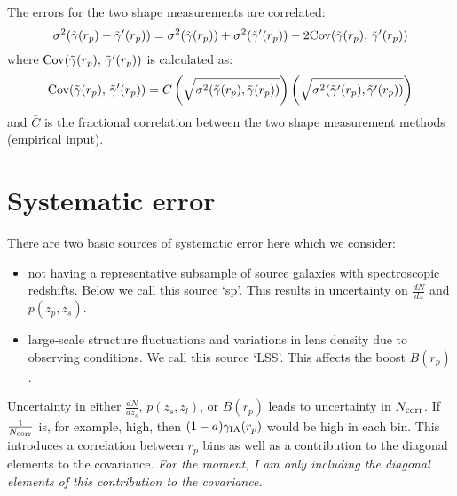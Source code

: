 \documentclass[onecolumn,amsmath,aps,fleqn, superscriptaddress]{revtex4}
\begin{document}
The errors for the two shape measurements are correlated:
\begin{equation}
\sigma^2(\tilde{\gamma}(r_p) - \tilde{\gamma}^\prime(r_p)) = \sigma^2(\tilde{\gamma}(r_p)) + \sigma^2(\tilde{\gamma}^\prime(r_p)) - 2 {\rm Cov}( \tilde{\gamma}(r_p), \, \tilde{\gamma}^\prime(r_p))
\label{comb_gammat}
\end{equation}
where ${\rm Cov}( \tilde{\gamma}(r_p), \, \tilde{\gamma}^\prime(r_p))$ is calculated as:
\begin{equation}
{\rm Cov}( \tilde{\gamma}(r_p), \, \tilde{\gamma}^\prime(r_p)) = \bar{C} \left(\sqrt{\sigma^2(\tilde{\gamma}(r_p), \tilde{\gamma}(r_p))}\right)\left(\sqrt{\sigma^2(\tilde{\gamma}^\prime(r_p), \tilde{\gamma}^\prime(r_p))}\right)
\label{Cov}
\end{equation}
and $\bar{C}$ is the fractional correlation between the two shape measurement methods (empirical input).

\section*{Systematic error}

There are two basic sources of systematic error here which we consider:
\begin{itemize}
\item{not having a representative subsample of source galaxies with spectroscopic redshifts. Below we call this source `sp'. This results in uncertainty on $\frac{dN}{dz}$ and $p(z_p, z_s)$.}
\item{large-scale structure fluctuations and variations in lens density due to observing conditions. We call this source `LSS'. This affects the boost $B(r_p)$.}
\end{itemize}
Uncertainty in either $\frac{dN}{dz_s}$, $p(z_s, z_l)$, or $B(r_p)$ leads to uncertainty in $N_{\rm corr}$. If $\frac{1}{N_{\rm corr}}$ is, for example, high, then $(1-a)\gamma_{\rm IA}(r_p)$ would be high in each bin. This introduces a correlation between $r_p$ bins as well as a contribution to the diagonal elements to the covariance. {\it For the moment, I am only including the diagonal elements of this contribution to the covariance.}
\end{document}
